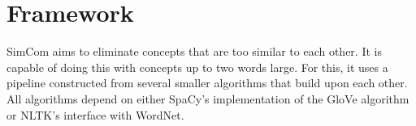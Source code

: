 \documentclass{article}
\begin{document}




\section{Framework} \label{sec:framework}

SimCom aims to eliminate concepts that are too similar to each other. It is capable of doing this with concepts up to two words large. For this, it uses a pipeline constructed from several smaller algorithms that build upon each other. All algorithms depend on either SpaCy's implementation of the GloVe algorithm or NLTK's interface with WordNet.
\end{document}
